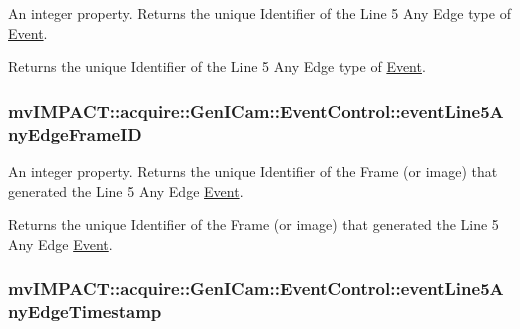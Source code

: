 An integer property. Returns the unique Identifier of the Line 5 Any Edge type of \hyperlink{classmv_i_m_p_a_c_t_1_1acquire_1_1_event}{Event}. 

Returns the unique Identifier of the Line 5 Any Edge type of \hyperlink{classmv_i_m_p_a_c_t_1_1acquire_1_1_event}{Event}. \hypertarget{classmv_i_m_p_a_c_t_1_1acquire_1_1_gen_i_cam_1_1_event_control_a13926486b4e9a3cc389f790a4dcaee2e}{
\subsubsection[{event\+Line5\+Any\+Edge\+Frame\+I\+D}]{ mv\+I\+M\+P\+A\+C\+T\+::acquire\+::\+Gen\+I\+Cam\+::\+Event\+Control\+::event\+Line5\+Any\+Edge\+Frame\+I\+D}}\label{classmv_i_m_p_a_c_t_1_1acquire_1_1_gen_i_cam_1_1_event_control_a13926486b4e9a3cc389f790a4dcaee2e}


An integer property. Returns the unique Identifier of the Frame (or image) that generated the Line 5 Any Edge \hyperlink{classmv_i_m_p_a_c_t_1_1acquire_1_1_event}{Event}. 

Returns the unique Identifier of the Frame (or image) that generated the Line 5 Any Edge \hyperlink{classmv_i_m_p_a_c_t_1_1acquire_1_1_event}{Event}. \hypertarget{classmv_i_m_p_a_c_t_1_1acquire_1_1_gen_i_cam_1_1_event_control_aa96cb2770ad9a4d4440cc9f5adf94e0c}{
\subsubsection[{event\+Line5\+Any\+Edge\+Timestamp}]{ mv\+I\+M\+P\+A\+C\+T\+::acquire\+::\+Gen\+I\+Cam\+::\+Event\+Control\+::event\+Line5\+Any\+Edge\+Timestamp}}\label{classmv_i_m_p_a_c_t_1_1acquire_1_1_gen_i_cam_1_1_event_control_aa96cb2770ad9a4d4440cc9f5adf94e0c}



